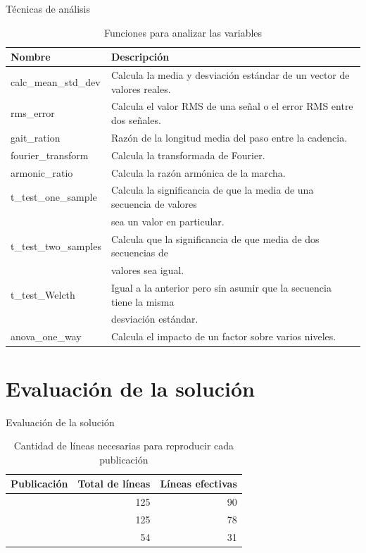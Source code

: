 \documentclass{beamer} %
\newcommand{\mono}[1]{{\ttfamily #1}}
\begin{document}
\begin{frame}{Técnicas de análisis}
\begin{table}
    \centering
    \caption{Funciones para analizar las variables}
    \label{tab:analytics}
    \scriptsize
    \begin{tabular}{ll}
        \toprule
        Nombre & Descripción \\
        \midrule
        \mono{calc\_mean\_std\_dev} & Calcula la media y desviación estándar de un vector de valores reales. \\
        \mono{rms\_error} & Calcula el valor RMS de una señal o el error RMS entre dos señales. \\
        \mono{gait\_ration} & Razón de la longitud media del paso entre la cadencia. \\
        \mono{fourier\_transform} & Calcula la transformada de Fourier. \\
        \mono{armonic\_ratio} & Calcula la razón armónica de la marcha. \\
        \mono{t\_test\_one\_sample} & Calcula la significancia de que la media de una secuencia de valores \\ &  sea un valor en particular. \\
        \mono{t\_test\_two\_samples} & Calcula que la significancia de que media de dos secuencias de \\ & valores sea igual. \\
        \mono{t\_test\_Welcth} & Igual a la anterior pero sin asumir que la secuencia tiene la misma \\ & desviación estándar. \\
        \mono{anova\_one\_way} & Calcula el impacto de un factor sobre varios niveles. \\
        \bottomrule
    \end{tabular}
\end{table}
\end{frame}

\section{Evaluación de la solución}

\begin{frame}{Evaluación de la solución}
 \begin{table}
    \centering
    \caption{Cantidad de líneas necesarias para reproducir cada publicación}
    \label{tab:eval_lineas}
    \begin{tabular}{lrr}
        \toprule
        Publicación & Total de líneas & Líneas efectivas \\
        \midrule
        \cite{mazza} & 125 & 90 \\
        \cite{menz} & 125 & 78 \\
        \cite{mizoguchi} & 54 & 31 \\
        \bottomrule
    \end{tabular}
\end{table}

   
\end{frame}
\end{document}
